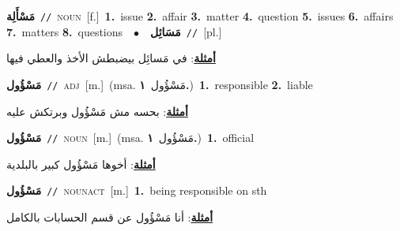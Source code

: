 \documentclass[10pt,a4paper,twoside]{article} %
\begin{document}
\begin{multicols}{2}
{\setlength\topsep{0pt}\textbf{\foreignlanguage{arabic}{مَسْأَلِة}}\ {\color{gray}\texttt{//}\color{black}}\ \textsc{noun}\ [f.]\ \textbf{1.}~issue  \textbf{2.}~affair  \textbf{3.}~matter  \textbf{4.}~question  \textbf{5.}~issues  \textbf{6.}~affairs  \textbf{7.}~matters  \textbf{8.}~questions\ \ $\bullet$\ \ \setlength\topsep{0pt}\textbf{\foreignlanguage{arabic}{مَسَائِل}}\ {\color{gray}\texttt{//}\color{black}}\ [pl.]\  \begin{flushright}\color{gray}\foreignlanguage{arabic}{\textbf{\underline{\foreignlanguage{arabic}{أمثلة}}}: في مَسائِل بيضبطش الأخذ والعطي فيها}\end{flushright}\color{black}} \vspace{2mm}

{\setlength\topsep{0pt}\textbf{\foreignlanguage{arabic}{مَسْؤُول}}\ {\color{gray}\texttt{//}\color{black}}\ \textsc{adj}\ [m.]\ \color{gray}(msa. \foreignlanguage{arabic}{مَسْؤُول}~\foreignlanguage{arabic}{\textbf{١.}})\color{black}\ \textbf{1.}~responsible  \textbf{2.}~liable\  \begin{flushright}\color{gray}\foreignlanguage{arabic}{\textbf{\underline{\foreignlanguage{arabic}{أمثلة}}}: بحسه مش مَسْؤُول وبرتكش عليه}\end{flushright}\color{black}} \vspace{2mm}

{\setlength\topsep{0pt}\textbf{\foreignlanguage{arabic}{مَسْؤُول}}\ {\color{gray}\texttt{//}\color{black}}\ \textsc{noun}\ [m.]\ \color{gray}(msa. \foreignlanguage{arabic}{مَسْؤُول}~\foreignlanguage{arabic}{\textbf{١.}})\color{black}\ \textbf{1.}~official\  \begin{flushright}\color{gray}\foreignlanguage{arabic}{\textbf{\underline{\foreignlanguage{arabic}{أمثلة}}}: أخوها مَسْؤُول كبير بالبلدية}\end{flushright}\color{black}} \vspace{2mm}

{\setlength\topsep{0pt}\textbf{\foreignlanguage{arabic}{مَسْؤُول}}\ {\color{gray}\texttt{//}\color{black}}\ \textsc{noun\textunderscore act}\ [m.]\ \textbf{1.}~being responsible on sth\  \begin{flushright}\color{gray}\foreignlanguage{arabic}{\textbf{\underline{\foreignlanguage{arabic}{أمثلة}}}: أنا مَسْؤُول عن قسم الحسابات بالكامل}\end{flushright}\color{black}} \vspace{2mm}


\end{multicols}
\end{document}
